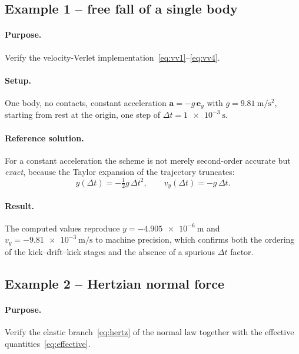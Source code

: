 \subsection{Example 1 -- free fall of a single body}

\paragraph{Purpose.}  Verify the velocity-Verlet
implementation~\eqref{eq:vv1}--\eqref{eq:vv4}.

\paragraph{Setup.}  One body, no contacts, constant acceleration
$\mathbf{a}=-g\,\mathbf{e}_{y}$ with $g=\qty{9.81}{\metre\per\second\squared}$,
starting from rest at the origin, one step of
$\Delta t=\qty{1e-3}{\second}$.

\paragraph{Reference solution.}  For a constant acceleration the scheme is not
merely second-order accurate but \emph{exact}, because the Taylor expansion of
the trajectory truncates:
\begin{equation}
  y(\Delta t) = -\tfrac{1}{2}g\,\Delta t^{2},
  \qquad
  v_{y}(\Delta t) = -g\,\Delta t .
\end{equation}

\paragraph{Result.}  The computed values reproduce
$y=\qty{-4.905e-6}{\metre}$ and $v_{y}=\qty{-9.81e-3}{\metre\per\second}$ to
machine precision, which confirms both the ordering of the kick--drift--kick
stages and the absence of a spurious $\Delta t$ factor.

\subsection{Example 2 -- Hertzian normal force}

\paragraph{Purpose.}  Verify the elastic branch~\eqref{eq:hertz} of the normal
law together with the effective quantities~\eqref{eq:effective}.

